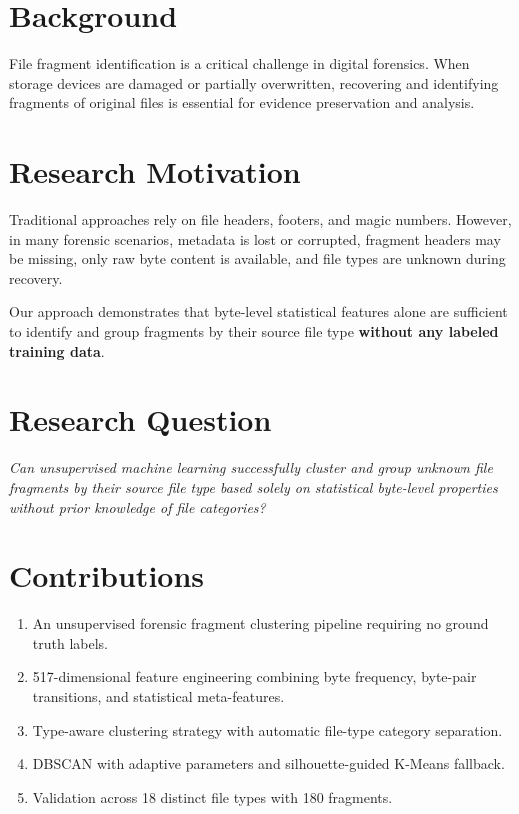 \documentclass[12pt,a4paper]{report}
\begin{document}
\begin{normalsize}
\noindent

\section{Background}
{\setlength{\baselineskip}{1.0\baselineskip}
File fragment identification is a critical challenge in digital forensics. When storage devices are damaged or partially overwritten, recovering and identifying fragments of original files is essential for evidence preservation and analysis.
\par}

\section{Research Motivation}
{\setlength{\baselineskip}{1.0\baselineskip}
Traditional approaches rely on file headers, footers, and magic numbers. However, in many forensic scenarios, metadata is lost or corrupted, fragment headers may be missing, only raw byte content is available, and file types are unknown during recovery.

Our approach demonstrates that byte-level statistical features alone are sufficient to identify and group fragments by their source file type \textbf{without any labeled training data}.
\par}

\section{Research Question}
{\setlength{\baselineskip}{1.0\baselineskip}
\textit{Can unsupervised machine learning successfully cluster and group unknown file fragments by their source file type based solely on statistical byte-level properties without prior knowledge of file categories?}
\par}

\section{Contributions}
{\setlength{\baselineskip}{1.0\baselineskip}
\begin{enumerate}[noitemsep]
    \item An unsupervised forensic fragment clustering pipeline requiring no ground truth labels.
    \item 517-dimensional feature engineering combining byte frequency, byte-pair transitions, and statistical meta-features.
    \item Type-aware clustering strategy with automatic file-type category separation.
    \item DBSCAN with adaptive parameters and silhouette-guided K-Means fallback.
    \item Validation across 18 distinct file types with 180 fragments.
\end{enumerate}
\par}

\end{normalsize}
\end{document}
